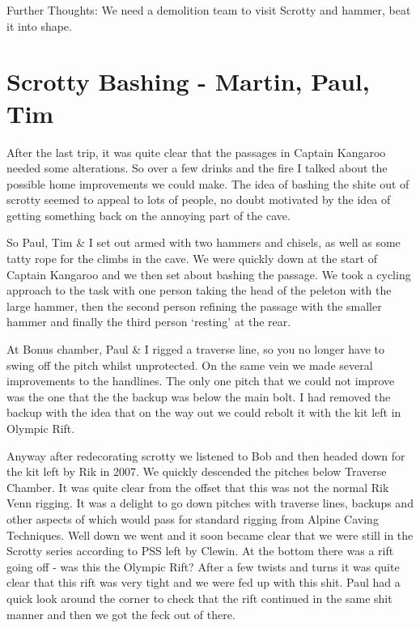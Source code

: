 Further Thoughts: We need a demolition team to visit Scrotty and hammer,
beat it into shape.


\section{Scrotty Bashing - Martin, Paul,
Tim}\label{scrotty-bashing---martin-paul-tim}

After the last trip, it was quite clear that the passages in Captain
Kangaroo needed some alterations. So over a few drinks and the fire I
talked about the possible home improvements we could make. The idea of
bashing the shite out of scrotty seemed to appeal to lots of people, no
doubt motivated by the idea of getting something back on the annoying
part of the cave.

So Paul, Tim \& I set out armed with two hammers and chisels, as well as
some tatty rope for the climbs in the cave. We were quickly down at the
start of Captain Kangaroo and we then set about bashing the passage. We
took a cycling approach to the task with one person taking the head of
the peleton with the large hammer, then the second person refining the
passage with the smaller hammer and finally the third person `resting'
at the rear.

At Bonus chamber, Paul \& I rigged a traverse line, so you no longer
have to swing off the pitch whilst unprotected. On the same vein we made
several improvements to the handlines. The only one pitch that we could
not improve was the one that the the backup was below the main bolt. I
had removed the backup with the idea that on the way out we could rebolt
it with the kit left in Olympic Rift.

Anyway after redecorating scrotty we listened to Bob and then headed
down for the kit left by Rik in 2007. We quickly descended the pitches
below Traverse Chamber. It was quite clear from the offset that this was
not the normal Rik Venn rigging. It was a delight to go down pitches
with traverse lines, backups and other aspects of which would pass for
standard rigging from Alpine Caving Techniques. Well down we went and it
soon became clear that we were still in the Scrotty series according to
PSS left by Clewin. At the bottom there was a rift going off - was this
the Olympic Rift? After a few twists and turns it was quite clear that
this rift was very tight and we were fed up with this shit. Paul had a
quick look around the corner to check that the rift continued in the
same shit manner and then we got the feck out of there.

